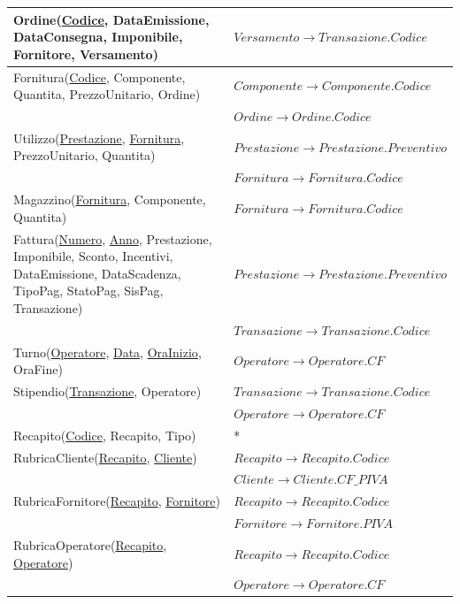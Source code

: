 \begin{longtable}{| p{8cm} | p{6.5cm} |}
			\hline
			Ordine(\underline{Codice}, DataEmissione, DataConsegna, Imponibile, Fornitore, Versamento) &
			$Versamento \rightarrow Transazione.Codice$ \\
			\hline
			Fornitura(\underline{Codice}, Componente, Quantita, PrezzoUnitario, Ordine) &
			$Componente \rightarrow Componente.Codice$ \\
			& $Ordine \rightarrow Ordine.Codice$ \\
			\hline
			Utilizzo(\underline{Prestazione}, \underline{Fornitura}, PrezzoUnitario, Quantita) &
			$Prestazione \rightarrow Prestazione.Preventivo$ \\
			& $Fornitura \rightarrow Fornitura.Codice$ \\
			\hline
			Magazzino(\underline{Fornitura}, Componente, Quantita) &
			$Fornitura \rightarrow Fornitura.Codice$ \\
			\hline
			Fattura(\underline{Numero}, \underline{Anno}, Prestazione, Imponibile, Sconto, Incentivi, DataEmissione, DataScadenza, TipoPag, StatoPag, SisPag, Transazione) &
			$Prestazione \rightarrow Prestazione.Preventivo$ \\
			& $Transazione \rightarrow Transazione.Codice$ \\
			\hline
			Turno(\underline{Operatore}, \underline{Data}, \underline{OraInizio}, OraFine) &
			$Operatore \rightarrow Operatore.CF$ \\
			\hline
			Stipendio(\underline{Transazione}, Operatore) &
			$Transazione \rightarrow Transazione.Codice$ \\
			& $Operatore \rightarrow Operatore.CF$ \\
			\hline
			Recapito(\underline{Codice}, Recapito, Tipo) &
			* \\ \hline
			RubricaCliente(\underline{Recapito}, \underline{Cliente}) &
			$Recapito \rightarrow Recapito.Codice$ \\
			& $Cliente \rightarrow Cliente.CF\_PIVA$ \\
			\hline
			RubricaFornitore(\underline{Recapito}, \underline{Fornitore}) &
			$Recapito \rightarrow Recapito.Codice$ \\
			& $Fornitore \rightarrow Fornitore.PIVA$ \\
			\hline
			RubricaOperatore(\underline{Recapito}, \underline{Operatore}) &
			$Recapito \rightarrow Recapito.Codice$ \\
			& $Operatore \rightarrow Operatore.CF$ \\
			\hline

		\end{longtable}
	\vspace{2ex}